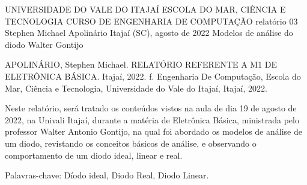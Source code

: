 
\begin{Info}
    {UNIVERSIDADE DO VALE DO ITAJAÍ}
    {ESCOLA DO MAR, CIÊNCIA E TECNOLOGIA}
    {CURSO DE ENGENHARIA DE COMPUTAÇÃO}
    {relatório 03}
    {Stephen Michael Apolinário}
    {Itajaí (SC), agosto de 2022}
    {Modelos de análise do diodo}
    {Walter Gontijo}
    {}
    \end{Info}
    
    
    
    
    \begin{Resumo}
    
    APOLINÁRIO, Stephen Michael. RELATÓRIO REFERENTE A M1 DE ELETRÔNICA BÁSICA. Itajaí, 2022. \pageref{LastPage} f. Engenharia De Computação, Escola do Mar, Ciência e Tecnologia, Universidade do Vale do Itajaí, Itajaí, 2022.
    
    
    Neste relatório, será tratado os conteúdos vistos na aula de dia 19 de agosto de 2022, na Univali Itajaí, durante a matéria de Eletrônica Básica, ministrada pelo professor Walter Antonio Gontijo, na qual foi abordado os modelos de análise de um diodo, revistando os conceitos básicos de análise, e observando o comportamento de um diodo ideal, linear e real.
    
    Palavras-chave: Díodo ideal, Diodo Real, Diodo Linear.
    
    \end{Resumo}
